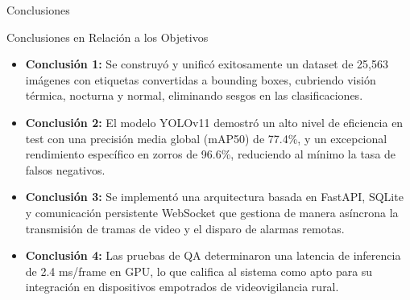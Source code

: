 \documentclass[10pt,aspectratio=169]{beamer}
\begin{document}
\begin{frame}{Conclusiones}
  \begin{block}{Conclusiones en Relación a los Objetivos}
    \small
    \begin{itemize}
      \item \textbf{Conclusión 1:} Se construyó y unificó exitosamente un dataset de 25,563 imágenes con etiquetas convertidas a bounding boxes, cubriendo visión térmica, nocturna y normal, eliminando sesgos en las clasificaciones.
      \item \textbf{Conclusión 2:} El modelo YOLOv11 demostró un alto nivel de eficiencia en test con una precisión media global (mAP50) de 77.4\%, y un excepcional rendimiento específico en zorros de 96.6\%, reduciendo al mínimo la tasa de falsos negativos.
      \item \textbf{Conclusión 3:} Se implementó una arquitectura basada en FastAPI, SQLite y comunicación persistente WebSocket que gestiona de manera asíncrona la transmisión de tramas de video y el disparo de alarmas remotas.
      \item \textbf{Conclusión 4:} Las pruebas de QA determinaron una latencia de inferencia de 2.4 ms/frame en GPU, lo que califica al sistema como apto para su integración en dispositivos empotrados de videovigilancia rural.
    \end{itemize}
  \end{block}
\end{frame}
\end{document}
